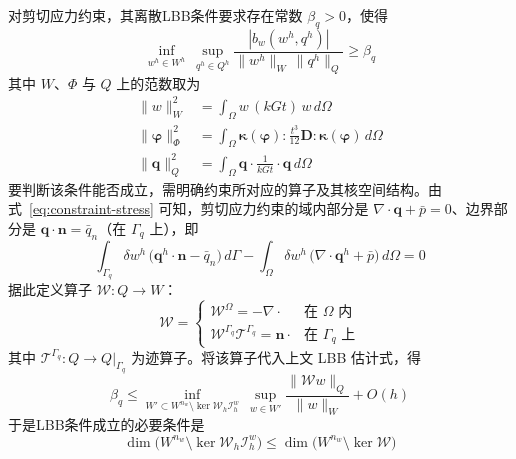 \documentclass[internationalmaster]{hquThesis}
\begin{document}
对剪切应力约束，其离散LBB条件要求存在常数 $\beta_q>0$，使得
\begin{equation}
    \inf_{w^{h}\in W^{h}}\ \sup_{q^{h}\in Q^{h}}
    \frac{|b_w(w^{h},q^{h})|}{\| w^{h}\|_W\,\| q^{h}\|_Q} \geq \beta_q
    \label{eq:lbb-betaq}
\end{equation}
其中 $W$、$\Phi$ 与 $Q$ 上的范数取为
\begin{equation}
    \begin{aligned}
        \| w\|_W^{2} &= \int_\Omega w\,(kGt)\,w\,d\Omega\\
        \| \boldsymbol\varphi\|_\Phi^{2} &= \int_\Omega \boldsymbol\kappa(\boldsymbol\varphi):\frac{t^3}{12}\boldsymbol D:\boldsymbol\kappa(\boldsymbol\varphi)\,d\Omega\\
        \| \boldsymbol q\|_Q^{2} &= \int_\Omega \boldsymbol q\cdot\frac{1}{kGt}\cdot\boldsymbol q\,d\Omega
    \end{aligned}
    \label{eq:norms}
\end{equation}
要判断该条件能否成立，需明确约束所对应的算子及其核空间结构。由式~\eqref{eq:constraint-stress} 可知，剪切应力约束的域内部分是 $\nabla\cdot\boldsymbol q+\bar{p}=0$、边界部分是 $\boldsymbol q\cdot\boldsymbol n=\bar{q}_n$（在 $\Gamma_q$ 上），即
\begin{equation}
    \int_{\Gamma_q}\delta w^{h}\,\bigl(\boldsymbol q^{h}\cdot\boldsymbol n-\bar{q}_n\bigr)\,d\Gamma
    - \int_\Omega \delta w^{h}\,\bigl(\nabla\cdot\boldsymbol q^{h}+\bar{p}\bigr)\,d\Omega = 0
    \label{eq:stress-op-decomp}
\end{equation}
据此定义算子 $\mathcal W:Q\to W$：
\begin{equation}
    \mathcal W = \begin{cases}
        \mathcal W^\Omega = -\nabla\cdot & \text{在 }\Omega\text{ 内}\\
        \mathcal W^{\Gamma_q}\mathcal T^{\Gamma_q} = \boldsymbol n\cdot & \text{在 }\Gamma_q\text{ 上}
    \end{cases}
    \label{eq:op-W}
\end{equation}
其中 $\mathcal T^{\Gamma_q}:Q\to Q|_{\Gamma_q}$ 为迹算子。将该算子代入上文 LBB 估计式，得
\begin{equation}
    \beta_q \leq \inf_{W'\subset W^{n_w}\setminus\ker\mathcal W_h \mathcal I_h^{w}}\ \sup_{w\in W'}
    \frac{\| \mathcal W w\|_Q}{\| w\|_W} + O(h)
    \label{eq:betaq-estimate}
\end{equation}
于是LBB条件成立的必要条件是
\begin{equation}
    \dim\bigl(W^{n_w}\setminus\ker\mathcal W_h \mathcal I_h^{w}\bigr)
    \leq \dim\bigl(W^{n_w}\setminus\ker\mathcal W\bigr)
    \label{eq:nec-dim-stress}
\end{equation}
\end{document}
